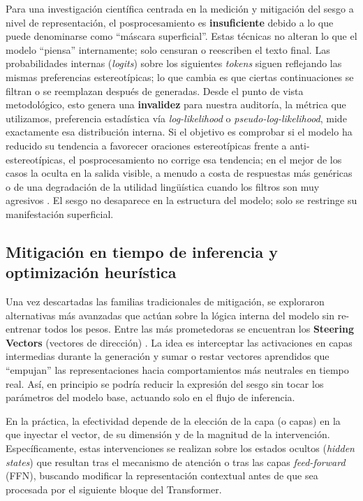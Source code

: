 \documentclass[12pt,a4paper]{report}
\begin{document}
Para una investigación científica centrada en la medición y mitigación del sesgo a nivel de representación, el posprocesamiento es \textbf{insuficiente} debido a lo que puede 
denominarse como ``máscara superficial''. Estas técnicas no alteran lo que el modelo ``piensa'' internamente; solo censuran o reescriben el texto final. 
Las probabilidades internas (\textit{logits}) sobre los siguientes \textit{tokens} siguen reflejando las mismas preferencias estereotípicas; lo que cambia es que 
ciertas continuaciones se filtran o se reemplazan después de generadas. Desde el punto de vista metodológico, esto genera una \textbf{invalidez} para nuestra auditoría, 
la métrica que utilizamos, preferencia estadística vía \textit{log-likelihood} o \textit{pseudo-log-likelihood}, mide exactamente esa distribución interna. 
Si el objetivo es comprobar si el modelo ha reducido su tendencia a favorecer oraciones estereotípicas frente a anti-estereotípicas, el posprocesamiento no corrige 
esa tendencia; en el mejor de los casos la oculta en la salida visible, a menudo a costa de respuestas más genéricas o de una degradación de la utilidad lingüística 
cuando los filtros son muy agresivos \cite{meade_empirical_2021}. El sesgo no desaparece en la estructura del modelo; solo se restringe su manifestación superficial.

\subsection{Mitigación en tiempo de inferencia y optimización heurística}
\label{subsec:mit_inference_dense}

Una vez descartadas las familias tradicionales de mitigación, se exploraron alternativas más avanzadas que actúan sobre la lógica interna del modelo sin re-entrenar todos los pesos. Entre las más prometedoras se encuentran los \textbf{Steering Vectors} (vectores de dirección) \cite{siddique_shifting_2025}. La idea es interceptar las activaciones en capas intermedias durante la generación y sumar o restar vectores aprendidos que ``empujan'' las representaciones hacia comportamientos más neutrales en tiempo real. Así, en principio se podría reducir la expresión del sesgo sin tocar los parámetros del modelo base, actuando solo en el flujo de inferencia.

En la práctica, la efectividad depende de la elección de la capa (o capas) en la que inyectar el vector, de su dimensión y de la magnitud de la intervención.  Específicamente, estas intervenciones se realizan sobre los estados ocultos (\textit{hidden states}) que resultan tras el mecanismo de atención o tras las capas \textit{feed-forward} (FFN), buscando modificar la representación contextual antes de que sea procesada por el siguiente bloque del Transformer.
\end{document}
